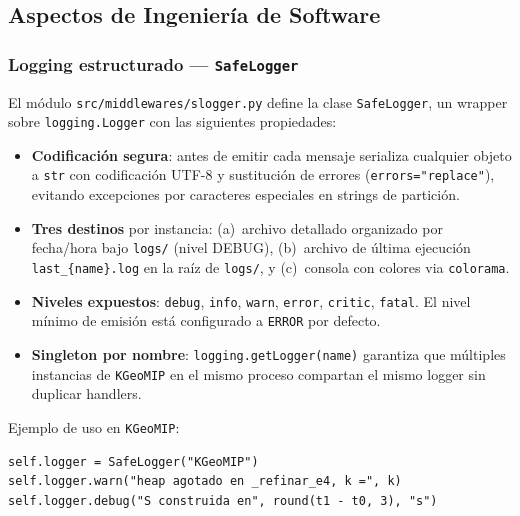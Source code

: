 \subsection{Aspectos de Ingeniería de Software}

\subsubsection*{Logging estructurado --- \texttt{SafeLogger}}

El módulo \texttt{src/middlewares/slogger.py} define la clase \texttt{SafeLogger},
un wrapper sobre \texttt{logging.Logger} con las siguientes propiedades:

\begin{itemize}
  \item \textbf{Codificación segura}: antes de emitir cada mensaje serializa
        cualquier objeto a \texttt{str} con codificación UTF-8 y sustitución
        de errores (\texttt{errors="replace"}), evitando excepciones por
        caracteres especiales en strings de partición.

  \item \textbf{Tres destinos} por instancia: (a)~archivo detallado organizado
        por fecha/hora bajo \texttt{logs/} (nivel DEBUG), (b)~archivo de última
        ejecución \texttt{last\_\{name\}.log} en la raíz de \texttt{logs/},
        y (c)~consola con colores via \texttt{colorama}.

  \item \textbf{Niveles expuestos}: \texttt{debug}, \texttt{info}, \texttt{warn},
        \texttt{error}, \texttt{critic}, \texttt{fatal}. El nivel mínimo de
        emisión está configurado a \texttt{ERROR} por defecto.

  \item \textbf{Singleton por nombre}: \texttt{logging.getLogger(name)} garantiza
        que múltiples instancias de \texttt{KGeoMIP} en el mismo proceso
        compartan el mismo logger sin duplicar handlers.
\end{itemize}

Ejemplo de uso en \texttt{KGeoMIP}:
\begin{lstlisting}
self.logger = SafeLogger("KGeoMIP")
self.logger.warn("heap agotado en _refinar_e4, k =", k)
self.logger.debug("S construida en", round(t1 - t0, 3), "s")
\end{lstlisting}

